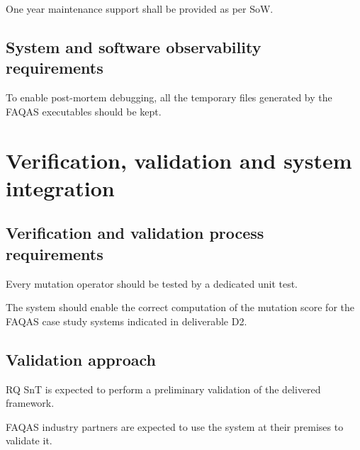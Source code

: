 \RQ{} One year maintenance support shall be provided as per SoW.


\subsection{System and software observability requirements}

\RQ{} To enable post-mortem debugging, all the temporary files generated by the FAQAS executables should be kept.

\section{Verification, validation and system integration}
 \subsection{Verification and validation process requirements}
 
  \RQ{} Every mutation operator should be tested by a dedicated unit test.
  
     \RQ{} The system should enable the correct computation of the mutation score for the FAQAS case study systems indicated in deliverable D2.
     
 \subsection{Validation approach}
 
 RQ{} SnT is expected to perform a preliminary validation of the delivered framework.

 \RQ{} FAQAS industry partners are expected to use the system at their premises to validate it.
 
 

